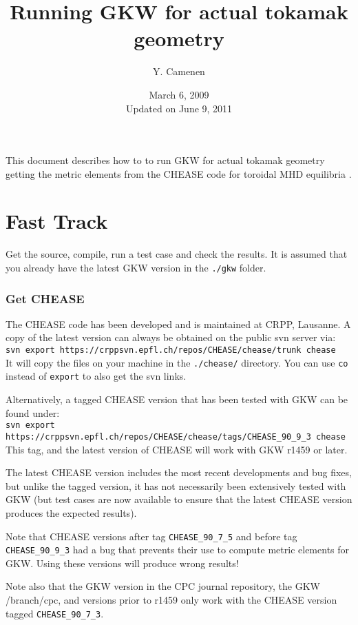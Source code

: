 \documentclass[a4paper,12pt]{article}
\title{Running GKW for actual tokamak geometry}
\author{Y. Camenen}
\date{March 6, 2009\\ Updated on June 9, 2011}
\begin{document}
\maketitle
This document describes how to to run GKW for actual tokamak geometry getting the metric elements from the CHEASE code for toroidal MHD equilibria \cite{Lutjens:Comput1992,Lutjens:Comput1996}.

\part*{Fast Track}
Get the source, compile, run a test case and check the results. It is assumed that you already have the latest GKW version in the \texttt{./gkw} folder.

\section{Get CHEASE}
The CHEASE code has been developed and is maintained at CRPP, Lausanne. A copy of the latest version can always be obtained on the public svn server via:\\
\texttt{\small svn export https://crppsvn.epfl.ch/repos/CHEASE/chease/trunk chease}\\
It will copy  the files on your machine in the \texttt{./chease/} directory. You can use \texttt{co} instead of \texttt{export} to also get the svn links.

Alternatively, a tagged CHEASE version that has been tested with GKW can be found under:\\
\texttt{\small svn export https://crppsvn.epfl.ch/repos/CHEASE/chease/tags/CHEASE\_90\_9\_3 chease}\\
This tag, and the latest version of CHEASE will work with GKW r1459 or later.  

The latest CHEASE version includes the most recent developments and bug fixes, but unlike the tagged version, it has not necessarily been extensively tested with GKW (but test cases are now available to ensure that the latest CHEASE version produces the expected results). 

Note that CHEASE versions after tag \texttt{CHEASE\_90\_7\_5} and before tag \texttt{CHEASE\_90\_9\_3} had a bug that prevents their use to compute metric elements for GKW. Using these versions will produce wrong results!

Note also that the GKW version in the CPC journal repository, the GKW /branch/cpc, and versions prior to r1459 only work with the CHEASE version tagged \texttt{CHEASE\_90\_7\_3}.
 
\end{document}
